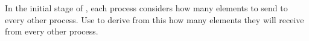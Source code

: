   \label{ex:radixsort1}
  In the initial stage of , each process
  considers how many elements to send to every other process.
  Use  to derive from this how many
  elements they will receive from every other process.
